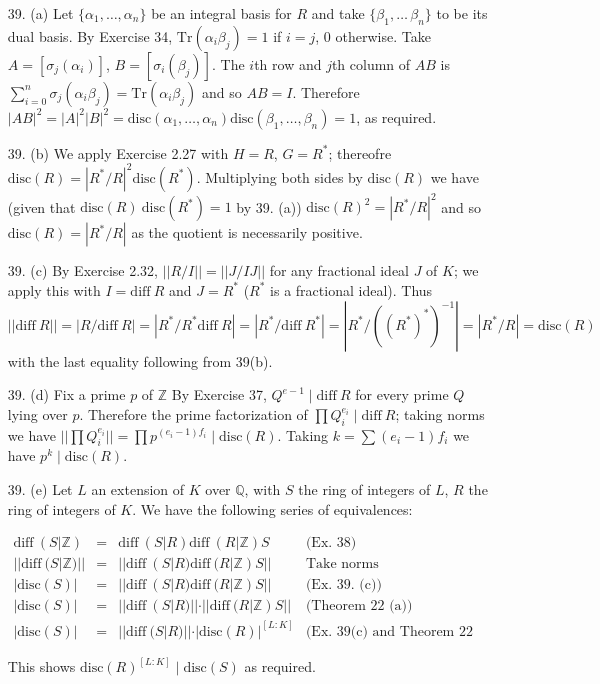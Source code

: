 \documentclass{article}
\newcommand{\Q}[0]{\mathbb{Q}}
\newcommand{\Z}[0]{\mathbb{Z}}
\newcommand{\trace}[1]{\text{Tr}(#1)}
\newcommand{\diff}[1]{\text{diff}\ #1}
\newcommand{\disc}[1]{\text{disc}(#1)}
\begin{document}
\begin{enumerate}
\item[39. (a)] Let $\{\alpha_1, \ldots, \alpha_n\}$ be an integral basis for $R$ and take $\{\beta_1,\ldots\,\beta_n\}$ to be its dual basis.  By Exercise 34, $\trace{\alpha_i\beta_j} = 1$ if $i = j$, $0$ otherwise.  Take $A = [\sigma_{j}(\alpha_i)]$, $B = [\sigma_{i}(\beta_j)]$.  The $i$th row and $j$th column of $AB$ is $\sum_{i = 0}^{n} \sigma_{j}(\alpha_i\beta_j) = \trace{\alpha_i\beta_j}$ and so $AB = I$.  Therefore $|AB|^2 = |A|^2 |B|^2 = \disc{\alpha_1, \ldots, \alpha_n} \disc{\beta_1,\ldots,\beta_n} = 1$, as required.

\item[39. (b)] We apply Exercise 2.27 with $H = R$, $G = R^{*}$; thereofre $\disc{R} = |R^* / R|^2\disc{R^*}$.  Multiplying both sides by $\disc{R}$ we have (given that $\disc{R}\ \disc{R^*} = 1$ by 39. (a)) $\disc{R}^2 = |R^* / R|^2$ and so $\disc{R} = |R^{*}/R|$ as the quotient is necessarily positive.

\item[39. (c)] By Exercise 2.32, $||R/I|| = ||J/IJ||$ for any fractional ideal $J$ of $K$; we apply this with $I = \diff{R}$ and $J = R^{*}$ ($R^{*}$ is a fractional ideal).  Thus $||\diff{R}|| = |R/\diff{R}| = |R^{*}/R^{*}\diff{R}| = |R^{*} / \diff{R^*}| = |R^{*} / ((R^{*})^{*})^{-1}| = |R^* / R| = \disc{R}$ with the last equality following from 39(b).

\item[39. (d)] Fix a prime $p$ of $\Z$  By Exercise 37, $Q^{e-1} \mid \diff{R}$ for every prime $Q$ lying over $p$.  Therefore the prime factorization of $\prod Q_{i}^{e_{i}} \mid \diff{R}$; taking norms we have $||\prod Q_{i}^{e_{i}}|| = \prod p^{(e_i - 1)f_i} \mid \disc{R}$.  Taking $k = \sum (e_i - 1)f_i$ we have $p^{k} \mid \disc{R}$.

\item[39. (e)] Let $L$ an extension of $K$ over $\Q$, with $S$ the ring of integers of $L$, $R$ the ring of integers of $K$. We have the following series of equivalences:

\[
\begin{array}{llll}
    \diff(S|\Z) &=& \diff(S|R)\diff(R|\Z)S &\text{(Ex. 38)}\\
    ||\diff(S|\Z)|| &=& ||\diff(S|R)\diff(R|\Z)S|| &\text{Take norms} \\
    |\disc{S}| &=& ||\diff(S|R)\diff(R|\Z)S|| & \text{(Ex. 39. (c))} \\
    |\disc{S}| &=& ||\diff(S|R)|| \cdot ||\diff(R|\Z)S|| & \text{(Theorem 22 (a))} \\
    |\disc{S}| &=& ||\diff(S|R)|| \cdot |\disc{R}|^{[L:K]} & \text{(Ex. 39(c) and Theorem 22 (b))}
\end{array}
\]

This shows $\disc{R}^{[L:K]} \mid \disc{S}$ as required.
\end{enumerate}
\end{document}
